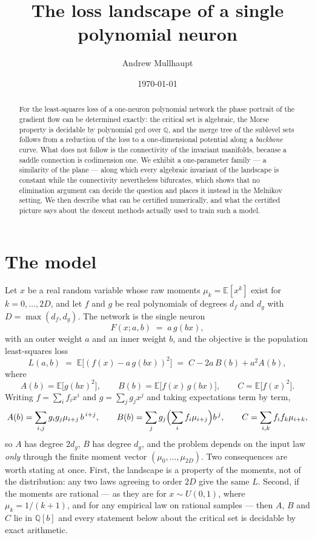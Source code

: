 \documentclass[11pt]{article}
\title{The loss landscape of a single polynomial neuron}
\author{Andrew Mullhaupt}
\date{\today}
\theoremstyle{plain}
\theoremstyle{definition}
\theoremstyle{remark}
\newcommand{\Q}{\mathbb{Q}}
\newcommand{\E}{\mathbb{E}}
\begin{document}
\maketitle

\begin{abstract}
For the least-squares loss of a one-neuron polynomial network the phase
portrait of the gradient flow can be determined exactly: the critical set is
algebraic, the Morse property is decidable by polynomial gcd over $\Q$, and
the merge tree of the sublevel sets follows from a reduction of the loss to a
one-dimensional potential along a \emph{backbone} curve. What does not follow
is the connectivity of the invariant manifolds, because a saddle connection is
codimension one. We exhibit a one-parameter family --- a similarity of the
plane --- along which every algebraic invariant of the landscape is constant
while the connectivity nevertheless bifurcates, which shows that no elimination
argument can decide the question and places it instead in the Melnikov setting.
We then describe what can be certified numerically, and what the certified
picture says about the descent methods actually used to train such a model.
\end{abstract}

\section{The model}

Let $x$ be a real random variable whose raw moments
\(
\mu_k = \E[x^k]
\)
exist for $k = 0,\dots,2D$, and let $f$ and $g$ be real polynomials of degrees
$d_f$ and $d_g$ with $D = \max(d_f, d_g)$. The network is the single neuron
\[
  F(x; a, b) \;=\; a\, g(bx),
\]
with an outer weight $a$ and an inner weight $b$, and the objective is the
population least-squares loss
\begin{equation}\label{eq:loss}
  L(a,b) \;=\; \E\bigl[(f(x) - a\,g(bx))^2\bigr]
         \;=\; C - 2a\,B(b) + a^2 A(b),
\end{equation}
where
\begin{equation}\label{eq:ABC}
  A(b) = \E\bigl[g(bx)^2\bigr], \qquad
  B(b) = \E\bigl[f(x)\,g(bx)\bigr], \qquad
  C    = \E\bigl[f(x)^2\bigr].
\end{equation}
Writing $f = \sum_i f_i x^i$ and $g = \sum_j g_j x^j$ and taking expectations
term by term,
\begin{equation}\label{eq:ABCcoeffs}
  A(b) = \sum_{i,j} g_i g_j \mu_{i+j}\, b^{\,i+j}, \qquad
  B(b) = \sum_{j} g_j \Bigl( \sum_i f_i \mu_{i+j} \Bigr) b^{\,j}, \qquad
  C    = \sum_{i,k} f_i f_k \mu_{i+k},
\end{equation}
so $A$ has degree $2d_g$, $B$ has degree $d_g$, and the problem depends on the
input law \emph{only} through the finite moment vector
$(\mu_0,\dots,\mu_{2D})$. Two consequences are worth stating at once. First,
the landscape is a property of the moments, not of the distribution: any two
laws agreeing to order $2D$ give the same $L$. Second, if the moments are
rational --- as they are for $x \sim U(0,1)$, where $\mu_k = 1/(k+1)$, and for
any empirical law on rational samples --- then $A$, $B$ and $C$ lie in
$\Q[b]$ and every statement below about the critical set is decidable by exact
arithmetic.
\end{document}
